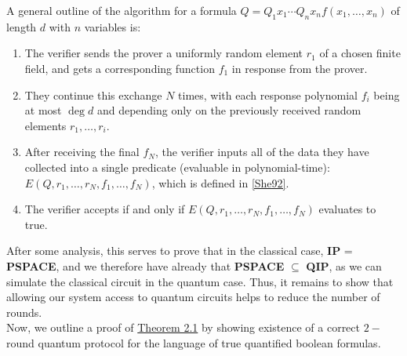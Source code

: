 \documentclass[12pt]{article}
\numberwithin{thm}{section}
\numberwithin{defn}{section}
\numberwithin{prop}{section}
\numberwithin{rmk}{section}
\begin{document}
	\indent A general outline of the algorithm for a formula $Q=Q_1x_1\cdots Q_nx_nf(x_1,\dots,x_n)$ of length $d$ with $n$ variables is:
	 \begin{enumerate}
	 	\item The verifier sends the prover a uniformly random element $r_1$ of a chosen finite field, and gets a corresponding function $f_1$ in response from the prover.
	 	\item They continue this exchange $N$ times, with each response polynomial $f_i$ being at most $\deg d$ and  depending only on the previously received random elements $r_1,\dots,r_{i}$. 
	 	\item After receiving  the final $f_N$, the verifier inputs all of the data they have collected into a single predicate (evaluable in polynomial-time): $E(Q,r_1,\dots,r_N,f_1,\dots,f_N)$, which is defined in \hyperref[she92]{[She92]}.
	 	\item The verifier accepts if and only if $E(Q,r_1,\dots,r_N,f_1,\dots,f_N)$ evaluates to true.
	 \end{enumerate}
	 	
	After some analysis, this serves to prove that in the classical case, \textbf{IP} = \textbf{PSPACE}, and we therefore have already that \textbf{PSPACE} $\subseteq$ \textbf{QIP}, as we can simulate the classical circuit in the quantum case. Thus, it remains to show that allowing our system access to quantum circuits helps to reduce the number of rounds.\\
	
	Now, we outline a proof of \hyperref[thm1]{Theorem 2.1} by showing existence of a correct $2-$round quantum protocol for the language of true quantified boolean formulas.
	
\end{document}
